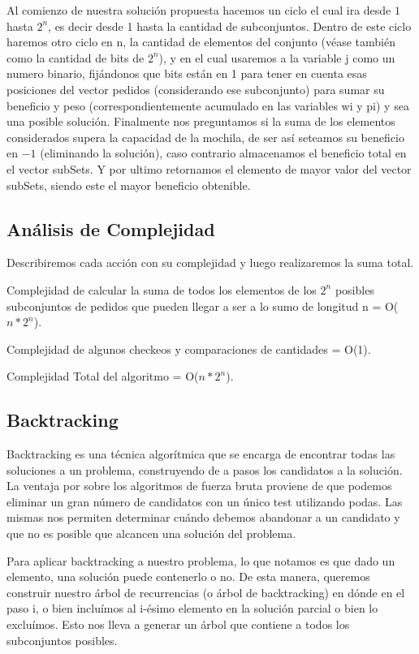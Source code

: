 Al comienzo de nuestra solución propuesta hacemos un ciclo el cual ira desde $1$ hasta $2^{n}$, es decir desde 1 hasta la cantidad de subconjuntos. Dentro de este ciclo haremos otro ciclo en n, la cantidad de elementos del conjunto (véase también como la cantidad de bits de $2^{n}$), y en el cual usaremos a la variable j como un numero binario, fijándonos que bits están en 1 para tener en cuenta esas posiciones del vector pedidos (considerando ese subconjunto) para sumar su beneficio y peso (correspondientemente acumulado en las variables wi y pi) y sea una posible solución. Finalmente nos preguntamos si la suma de los elementos considerados supera la capacidad de la mochila, de ser así seteamos su beneficio en $-1$ (eliminando la solución), caso contrario almacenamos el beneficio total en el vector subSets. Y por ultimo retornamos el elemento de mayor valor del vector subSets, siendo este el mayor beneficio obtenible.

\subsection*{Análisis de Complejidad}
Describiremos cada acción con su complejidad y luego realizaremos la suma total.


Complejidad de calcular la suma de todos los elementos de los $2^{n}$ posibles subconjuntos de pedidos que pueden llegar a ser a lo sumo de longitud n = O($n*2^{n}$).


Complejidad de algunos checkeos y comparaciones de cantidades = O(1).


Complejidad Total del algoritmo = O($n*2^{n}$).

\subsection{Backtracking}

Backtracking es una técnica algorítmica que se encarga de encontrar todas las soluciones a un problema, construyendo de a pasos los candidatos a la solución. La ventaja por sobre los algoritmos de fuerza bruta proviene de que podemos eliminar un gran número de candidatos con un único test utilizando podas. Las mismas nos permiten determinar cuándo debemos abandonar a un candidato y que no es posible que alcancen una solución del problema.

Para aplicar backtracking a nuestro problema, lo que notamos es que dado un elemento, una solución puede contenerlo o no. De esta manera, queremos construir nuestro árbol de recurrencias (o árbol de backtracking) en dónde en el paso i, o bien incluímos al i-ésimo elemento en la solución parcial o bien lo excluímos. Esto nos lleva a generar un árbol que contiene a todos los subconjuntos posibles.

